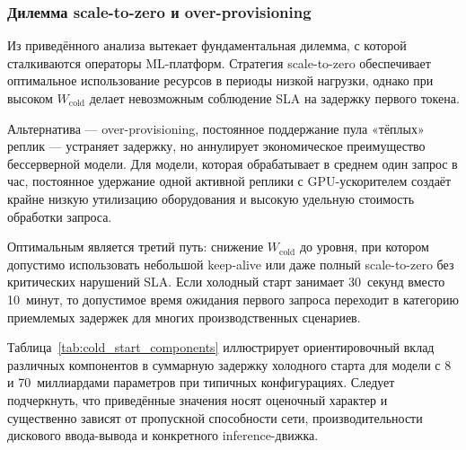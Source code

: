 \subsubsection{Дилемма scale-to-zero и over-provisioning}

Из приведённого анализа вытекает фундаментальная дилемма, с которой сталкиваются операторы ML-платформ. Стратегия scale-to-zero обеспечивает оптимальное использование ресурсов в периоды низкой нагрузки, однако при высоком $W_{\mathrm{cold}}$ делает невозможным соблюдение SLA на задержку первого токена.

Альтернатива --- over-provisioning, постоянное поддержание пула «тёплых» реплик --- устраняет задержку, но аннулирует экономическое преимущество бессерверной модели. Для модели, которая обрабатывает в среднем один запрос в час, постоянное удержание одной активной реплики с GPU-ускорителем создаёт крайне низкую утилизацию оборудования и высокую удельную стоимость обработки запроса.

Оптимальным является третий путь: снижение $W_{\mathrm{cold}}$ до уровня, при котором допустимо использовать небольшой keep-alive или даже полный scale-to-zero без критических нарушений SLA. Если холодный старт занимает 30~секунд вместо 10~минут, то допустимое время ожидания первого запроса переходит в категорию приемлемых задержек для многих производственных сценариев.

Таблица~\ref{tab:cold_start_components} иллюстрирует ориентировочный вклад различных компонентов в суммарную задержку холодного старта для модели с 8 и 70~миллиардами параметров при типичных конфигурациях. Следует подчеркнуть, что приведённые значения носят оценочный характер и существенно зависят от пропускной способности сети, производительности дискового ввода-вывода и конкретного inference-движка.

